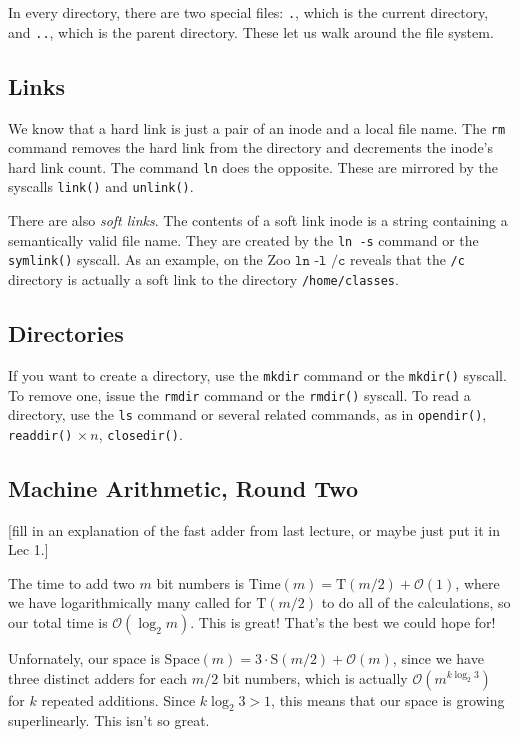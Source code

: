In every directory, there are two special files: \texttt{.}, which is the current directory, and \texttt{..}, which is the parent directory. These let us walk around the file system.

\subsection*{Links}

We know that a hard link is just a pair of an inode and a local file name. The \texttt{rm} command removes the hard link from the directory and decrements the inode's hard link count. The command \texttt{ln} does the opposite. These are mirrored by the syscalls \texttt{link()} and \texttt{unlink()}.

There are also \emph{soft links}. The contents of a soft link inode is a string containing a semantically valid file name. They are created by the \texttt{ln -s} command or the \texttt{symlink()} syscall. As an example, on the Zoo $\texttt{ln -l /c}$ reveals that the \texttt{/c} directory is actually a soft link to the directory \texttt{/home/classes}.

\subsection*{Directories}

If you want to create a directory, use the \texttt{mkdir} command or the \texttt{mkdir()} syscall. To remove one, issue the \texttt{rmdir} command or the \texttt{rmdir()} syscall. To read a directory, use the \texttt{ls} command or several related commands, as in \texttt{opendir()}, \texttt{readdir()} $\times\, n$, \texttt{closedir()}.

\subsection*{Machine Arithmetic, Round Two}

[fill in an explanation of the fast adder from last lecture, or maybe just put it in Lec 1.]

The time to add two $m$ bit numbers is $\mathrm{Time}(m) = \mathrm{T}(m/2) + \mathcal{O}(1)$, where we have logarithmically many called for $\mathrm{T}(m/2)$ to do all of the calculations, so our total time is $\mathcal{O}(\log_2 m)$. This is great! That's the best we could hope for!

Unfornately, our space is $\mathrm{Space}(m) = 3 \cdot \mathrm{S}(m/2) + \mathcal{O}(m)$, since we have three distinct adders for each $m/2$ bit numbers, which is actually $\mathcal{O}(m^{k\log_2 3})$ for $k$ repeated additions. Since $k\log_2 3 > 1$, this means that our space is growing superlinearly. This isn't so great.


